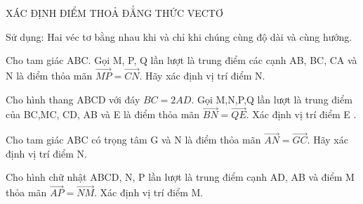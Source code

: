 \begin{dang}{XÁC ĐỊNH ĐIỂM THOẢ ĐẲNG THỨC VECTƠ}
    \begin{pp}
        \item Sử dụng: Hai véc tơ bằng nhau khi và chỉ khi chúng cùng độ dài và cùng hướng.
    \end{pp}

    \begin{vd}
        Cho tam giác ABC. Gọi M, P, Q lần lượt là trung điểm các cạnh AB, BC, CA và N là điểm thỏa mãn $\vec{MP} = \vec{CN}$. Hãy xác định vị trí điểm N.
    \end{vd}

    \begin{vd}
        Cho hình thang ABCD với đáy $BC = 2AD$. Gọi M,N,P,Q lần lượt là trung điểm của BC,MC, CD, AB và E là điểm thỏa mãn $\vec{BN} = \vec{QE}$. Xác định vị trí điểm E .
    \end{vd}

    \begin{vd}
        Cho tam giác ABC có trọng tâm G và N là điểm thỏa mãn $\vec{AN} = \vec{GC}$. Hãy xác định vị trí điểm N.
    \end{vd}

    \begin{vd}
        Cho hình chữ nhật ABCD, N, P lần lượt là trung điểm cạnh AD, AB và điểm M thỏa mãn $\vec{AP} = \vec{NM}$. Xác định vị trí điểm M.
    \end{vd}


\end{dang}
